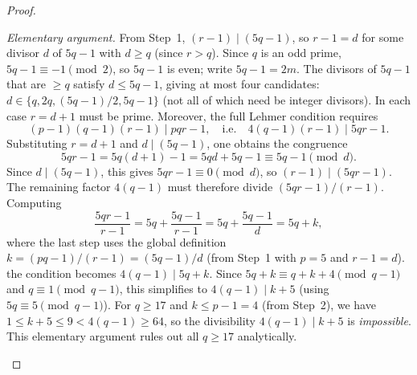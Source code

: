 \documentclass[12pt,a4paper]{amsart}
\theoremstyle{definition}
\begin{document}
\begin{proof}
\begin{itemize}
\begin{itemize}
                \textit{Elementary argument.}
                From Step~1, $(r-1) \mid (5q - 1)$, so $r - 1 = d$ for some
                divisor $d$ of $5q - 1$ with $d \ge q$ (since $r > q$).
                Since $q$ is an odd prime, $5q - 1 \equiv -1 \pmod{2}$, so
                $5q - 1$ is even; write $5q - 1 = 2m$.
                The divisors of $5q - 1$ that are $\ge q$ satisfy
                $d \le 5q - 1$, giving at most four candidates:
                $d \in \{q, 2q, (5q-1)/2, 5q-1\}$ (not all of which need be
                integer divisors).
                In each case $r = d + 1$ must be prime.  Moreover, the full
                Lehmer condition requires
                \[
                  (p-1)(q-1)(r-1) \;\Big|\; pqr - 1,
                  \quad\text{i.e.}\quad
                  4(q-1)(r-1) \;\Big|\; 5qr - 1.
                \]
                Substituting $r = d + 1$ and $d \mid (5q-1)$, one obtains the
                congruence
                \[
                  5qr - 1 = 5q(d+1) - 1 = 5qd + 5q - 1 \equiv 5q - 1
                  \pmod{d}.
                \]
                Since $d \mid (5q-1)$, this gives $5qr - 1 \equiv 0 \pmod{d}$,
                so $(r-1) \mid (5qr-1)$.  The remaining factor $4(q-1)$
                must therefore divide $(5qr-1)/(r-1)$.  Computing
                \[
                  \frac{5qr-1}{r-1} = 5q + \frac{5q-1}{r-1} = 5q + \frac{5q-1}{d} = 5q + k,
                \]
                where the last step uses the global definition $k = (pq-1)/(r-1) = (5q-1)/d$
                (from Step~1 with $p = 5$ and $r - 1 = d$).
                the condition becomes $4(q-1) \mid 5q + k$.  Since
                $5q + k \equiv q + k + 4 \pmod{q-1}$ and $q \equiv 1 \pmod{q-1}$,
                this simplifies to $4(q-1) \mid k + 5$
                (using $5q \equiv 5 \pmod{q-1}$).
                For $q \ge 17$ and $k \le p - 1 = 4$ (from Step~2), we have
                $1 \le k + 5 \le 9 < 4(q-1) \ge 64$, so the divisibility
                $4(q-1) \mid k + 5$ is \emph{impossible}.
                This elementary argument rules out all $q \ge 17$ analytically.


\end{itemize}
\end{itemize}
\end{proof}
\end{document}
